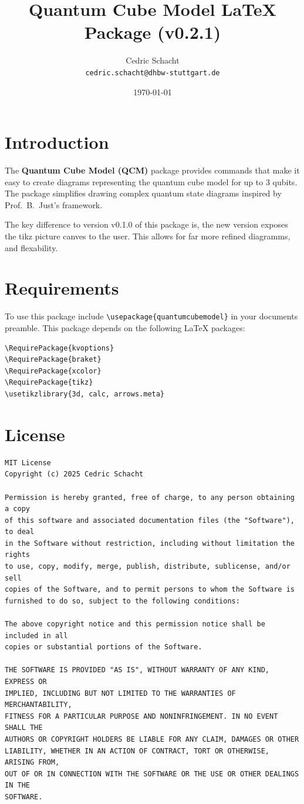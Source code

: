 \documentclass{article}
\title{Quantum Cube Model LaTeX Package (v0.2.1)}
\author{Cedric Schacht \\ \texttt{cedric.schacht@dhbw-stuttgart.de}}
\date{\today}
\begin{document}
\maketitle

\section*{Introduction}

The \textbf{Quantum Cube Model (QCM)} package provides commands that make it easy to create diagrams representing the quantum cube model for up to 3 qubits.
The package simplifies drawing complex quantum state diagrams inspired by Prof.~B.~Just's framework.

The key difference to version v0.1.0 of this package is,
the new version exposes the tikz picture canves to the user.
This allows for far more refined diagramms, and flexability.

\section*{Requirements}
To use this package include \verb|\usepackage{quantumcubemodel}| in your documents preamble.
This package depends on the following LaTeX packages:
\begin{verbatim}
\RequirePackage{kvoptions}
\RequirePackage{braket}
\RequirePackage{xcolor}
\RequirePackage{tikz}
\usetikzlibrary{3d, calc, arrows.meta}
\end{verbatim}

\section*{License}
\begin{verbatim}
MIT License
Copyright (c) 2025 Cedric Schacht

Permission is hereby granted, free of charge, to any person obtaining a copy
of this software and associated documentation files (the "Software"), to deal
in the Software without restriction, including without limitation the rights
to use, copy, modify, merge, publish, distribute, sublicense, and/or sell
copies of the Software, and to permit persons to whom the Software is
furnished to do so, subject to the following conditions:

The above copyright notice and this permission notice shall be included in all
copies or substantial portions of the Software.

THE SOFTWARE IS PROVIDED "AS IS", WITHOUT WARRANTY OF ANY KIND, EXPRESS OR
IMPLIED, INCLUDING BUT NOT LIMITED TO THE WARRANTIES OF MERCHANTABILITY,
FITNESS FOR A PARTICULAR PURPOSE AND NONINFRINGEMENT. IN NO EVENT SHALL THE
AUTHORS OR COPYRIGHT HOLDERS BE LIABLE FOR ANY CLAIM, DAMAGES OR OTHER
LIABILITY, WHETHER IN AN ACTION OF CONTRACT, TORT OR OTHERWISE, ARISING FROM,
OUT OF OR IN CONNECTION WITH THE SOFTWARE OR THE USE OR OTHER DEALINGS IN THE
SOFTWARE.
\end{verbatim}
\end{document}
